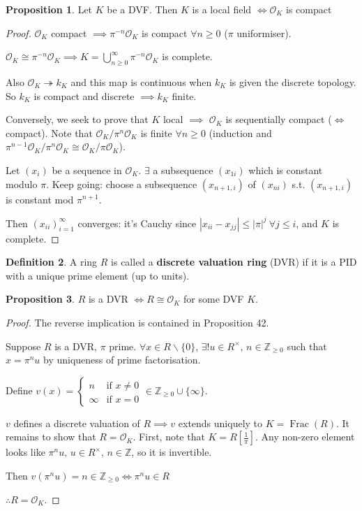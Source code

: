 \documentclass[a4paper]{article}
\theoremstyle{definition}
\newtheorem{definition}{Definition}
\theoremstyle{default}
\newtheorem{prop}[definition]{Proposition}
\theoremstyle{remark}
\newcommand*\abs[1]{\left|#1\right|}
\DeclareMathOperator{\Frac}{Frac}
\begin{document}
\begin{prop}
	Let $K$ be a DVF.
	Then $K$ is a local field $\iff \mathcal{O}_K$ is compact 
\end{prop}
\begin{proof}
	$\mathcal{O}_K$ compact $\implies \pi^{-n}\mathcal{O}_K$ is compact $\forall n \geq 0$ ($\pi$ uniformiser).
	
	$\mathcal{O}_K \cong \pi^{-n}\mathcal{O}_K \implies K = \bigcup_{n \geq 0}^{\infty} \pi^{-n} \mathcal{O}_K$ is complete.
	
	Also $\mathcal{O}_K \twoheadrightarrow k_K$ and this map is continuous when $k_K$ is given the discrete topology.
	So $k_K$ is compact and discrete $\implies k_K$ finite.
	
	Conversely, we seek to prove that $K$ local $\implies$ $\mathcal{O}_K$ is sequentially compact ($\iff$ compact).
	Note that $\mathcal{O}_K/\pi^n\mathcal{O}_K$ is finite $\forall n \geq 0$ (induction and $\pi^{n-1}\mathcal{O}_K/\pi^n\mathcal{O}_K \cong \mathcal{O}_K/\pi\mathcal{O}_K$).
	
	Let $(x_i)$ be a sequence in $\mathcal{O}_K$.
	$\exists$ a subsequence $(x_{1i})$ which is constant modulo $\pi$.
	Keep going: choose a subsequence $(x_{n+1,i})$ of $(x_{ni})$ s.t. $(x_{n+1, i})$ is constant mod $\pi^{n+1}$.
	
	Then $(x_{ii})_{i=1}^\infty$ converges: it's Cauchy since $\abs{x_{ii}-x_{jj}} \leq \abs{\pi}^j\ \forall j \leq i$, and $K$ is complete.
\end{proof}

\begin{definition}
	A ring $R$ is called a \textbf{discrete valuation ring} (DVR) if it is a PID with a unique prime element (up to units).
\end{definition}

\begin{prop}
	$R$ is a DVR $\iff R \cong \mathcal{O}_K$ for some DVF $K$.
\end{prop}
\begin{proof}
	The reverse implication is contained in Proposition 42.
	
	Suppose $R$ is a DVR, $\pi$ prime.
	$\forall x \in R \backslash \{0\}$,
	$\exists! u \in R^\times,\, n \in \mathbb{Z}_{\geq 0}$ such that $x = \pi^n u$
	by uniqueness of prime factorisation.
	
	Define $v(x) = \begin{cases}
	n & \text{if } x \neq 0 \\
	\infty & \text{if } x = 0
	\end{cases}
	\in \mathbb{Z}_{\geq 0} \cup \{\infty\}$.
	
	$v$ defines a discrete valuation of $R \implies v$ extends uniquely to $K = \Frac(R)$.
	It remains to show that $R=\mathcal{O}_K$.
	First, note that $K=R[\frac{1}{\pi}]$.
	Any non-zero element looks like $\pi^nu,\,u\in R^\times,\, n \in \mathbb{Z}$,
	so it is invertible.
	
	Then $v(\pi^nu)=n \in \mathbb{Z}_{\geq 0} \iff \pi^nu \in R$
	
	$\therefore R = \mathcal{O}_K$.
\end{proof}
\end{document}
